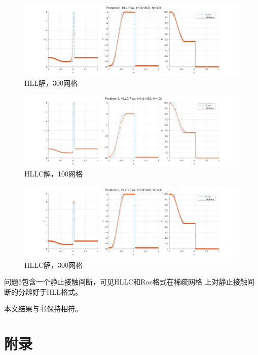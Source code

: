 \documentclass[UTF8,zihao=5]{ctexart} %
\begin{document}
\begin{figure}[H]
    \centering
    \includegraphics[width=18cm]{p5_HLL_N300.png}  %
    \caption{HLL解，300网格}
\end{figure}

\begin{figure}[H]
    \centering
    \includegraphics[width=18cm]{p5_HLLC_N100.png}  %
    \caption{HLLC解，100网格}
\end{figure}

\begin{figure}[H]
    \centering
    \includegraphics[width=18cm]{p5_HLLC_N300.png}  %
    \caption{HLLC解，300网格}
\end{figure}

问题5包含一个静止接触间断，可见HLLC和Roe格式在稀疏网格
上对静止接触间断的分辨好于HLL格式。



本文结果与书\cite{2013Riemann}保持相符。

{}



\section*{附录}
\end{document}
